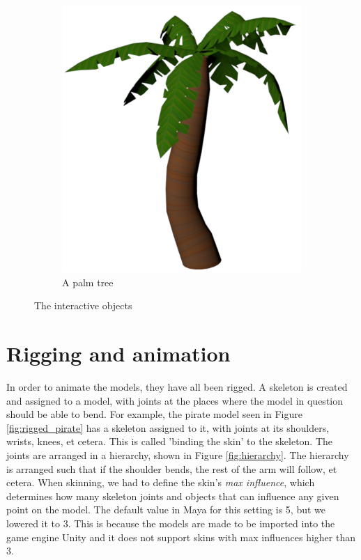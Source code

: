 \begin{figure}[h!]
\begin{subfigure}[b]{0.3\textwidth}
    \end{subfigure}
    \begin{subfigure}[b]{0.3\textwidth}
    	\centering
        \includegraphics[scale=0.2]{figures/PalmTree.png}\caption{A palm tree\label{fig:palmtree}}
    \end{subfigure}
\caption{The interactive objects}\label{fig:objects}
\end{figure}

\pagebreak
\section{Rigging and animation}
In order to animate the models, they have all been rigged. A skeleton is created and assigned to a model, with joints at the places where the model in question should be able to bend. For example, the pirate model seen in Figure \ref{fig:rigged_pirate} has a skeleton assigned to it, with joints at its shoulders, wrists, knees, et cetera. This is called 'binding the skin' to the skeleton. The joints are arranged in a hierarchy, shown in Figure \ref{fig:hierarchy}. The hierarchy is arranged such that if the shoulder bends, the rest of the arm will follow, et cetera. When skinning, we had to define the skin's \textit{max influence}, which determines how many skeleton joints and objects that can influence any given point on the model. The default value in Maya for this setting is 5, but we lowered it to 3. This is because the models are made to be imported into the game engine Unity \cite{unity} and it does not support skins with max influences higher than 3.


